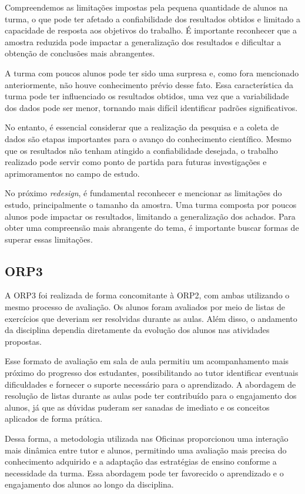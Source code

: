 Compreendemos as limitações impostas pela pequena quantidade de alunos na turma, o que pode ter afetado a confiabilidade dos resultados obtidos e limitado a capacidade de resposta aos objetivos do trabalho. É importante reconhecer que a amostra reduzida pode impactar a generalização dos resultados e dificultar a obtenção de conclusões mais abrangentes.

A turma com poucos alunos pode ter sido uma surpresa e, como fora mencionado anteriormente, não houve conhecimento prévio desse fato. Essa característica da turma pode ter influenciado os resultados obtidos, uma vez que a variabilidade dos dados pode ser menor, tornando mais difícil identificar padrões significativos.

No entanto, é essencial considerar que a realização da pesquisa e a coleta de dados são etapas importantes para o avanço do conhecimento científico. Mesmo que os resultados não tenham atingido a confiabilidade desejada, o trabalho realizado pode servir como ponto de partida para futuras investigações e aprimoramentos no campo de estudo.


No próximo \textit{redesign}, é fundamental reconhecer e mencionar as limitações do estudo, principalmente o tamanho da amostra. Uma turma composta por poucos alunos pode impactar os resultados, limitando a generalização dos achados. Para obter uma compreensão mais abrangente do tema, é importante buscar formas de superar essas limitações.

\subsection{ORP3} \label{sec:3orp}

A ORP3 foi realizada de forma concomitante à ORP2, com ambas utilizando o mesmo processo de avaliação. Os alunos foram avaliados por meio de listas de exercícios que deveriam ser resolvidas durante as aulas. Além disso, o andamento da disciplina dependia diretamente da evolução dos alunos nas atividades propostas.

Esse formato de avaliação em sala de aula permitiu um acompanhamento mais próximo do progresso dos estudantes, possibilitando ao tutor identificar eventuais dificuldades e fornecer o suporte necessário para o aprendizado. A abordagem de resolução de listas durante as aulas pode ter contribuído para o engajamento dos alunos, já que as dúvidas puderam ser sanadas de imediato e os conceitos aplicados de forma prática.

Dessa forma, a metodologia utilizada nas Oficinas proporcionou uma interação mais dinâmica entre tutor e alunos, permitindo uma avaliação mais precisa do conhecimento adquirido e a adaptação das estratégias de ensino conforme a necessidade da turma. Essa abordagem pode ter favorecido o aprendizado e o engajamento dos alunos ao longo da disciplina.

